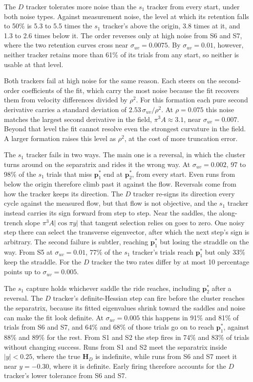 \documentclass[lettersize,journal]{IEEEtran}
\begin{document}
The $D$ tracker tolerates more noise than the $s_1$ tracker from every
start, under both noise types. Against measurement noise, the level at
which its retention falls to 50\% is 5.3 to 5.5 times the $s_1$ tracker's
above the origin, 3.8 times at it, and 1.3 to 2.6 times below it. The
order reverses only at high noise from S6 and S7, where the two retention
curves cross near $\sigma_{uv} = 0.0075$. By $\sigma_{uv} = 0.01$, however,
neither tracker retains more than 61\% of its trials from any start, so
neither is usable at that level.

Both trackers fail at high noise for the same reason. Each steers on the
second-order coefficients of the fit, which carry the most noise because
the fit recovers them from velocity differences divided by $\rho^2$. For
this formation each pure second derivative carries a standard deviation of
$2.53\,\sigma_{uv}/\rho^2$. At $\rho = 0.075$ this noise matches the
largest second derivative in the field, $\pi^3 A \approx 3.1$, near
$\sigma_{uv} = 0.007$. Beyond that level the fit cannot resolve even the
strongest curvature in the field. A larger formation raises this level as
$\rho^2$, at the cost of more truncation error.

The $s_1$ tracker fails in two ways. The main one is a reversal, in which
the cluster turns around on the separatrix and rides it the wrong way. At
$\sigma_{uv} = 0.002$, 97 to 98\% of the $s_1$ trials that
miss $\mathbf{p}^*_1$ end at $\mathbf{p}^*_2$, from every start.
Even runs from below the origin therefore climb past it against the flow.
Reversals come from how the tracker keeps its direction. The $D$ tracker
re-signs its direction every cycle against the measured flow, but that flow
is not objective, and the $s_1$ tracker instead carries its sign forward
from step to step. Near the saddles, the along-trench slope
$\pi^3 A|\cos\pi y|$ that tangent selection relies on goes to zero. One
noisy step there can select the transverse eigenvector, after which the
next step's sign is arbitrary. The second failure is subtler, reaching
$\mathbf{p}^*_1$ but losing the straddle on the way. From S5 at
$\sigma_{uv} = 0.01$, 77\% of the $s_1$ tracker's trials reach
$\mathbf{p}^*_1$ but only 33\% keep the straddle. For the $D$ tracker the
two rates differ by at most 10 percentage points up to
$\sigma_{uv} = 0.005$.

The $s_1$ capture holds whichever saddle the ride reaches, including
$\mathbf{p}^*_2$ after a reversal. The $D$ tracker's definite-Hessian step
can fire before the cluster reaches the separatrix, because its fitted
eigenvalues shrink toward the saddles and noise can make the fit look
definite. At $\sigma_{uv} = 0.005$ this happens in 91\% and 81\% of trials
from S6 and S7, and 64\% and 68\% of those trials go on to reach
$\mathbf{p}^*_1$, against 88\% and 89\% for the rest. From S1 and S2 the
step fires in 74\% and 83\% of trials without changing success. Runs from
S1 and S2 meet the separatrix inside $|y| < 0.25$, where the true
$\mathbf{H}_D$ is indefinite, while runs from S6 and S7 meet it near
$y = -0.30$, where it is definite. Early firing therefore accounts for the
$D$ tracker's lower tolerance from S6 and S7.
\end{document}
